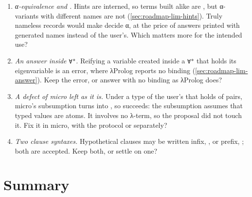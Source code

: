 \begin{enumerate}
    is loaded? The proposal does not measure what that would cost.
  \item \emph{α-equivalence and .} Hints are interned, so terms built alike are
    , but α-variants with different names are not (\cref{sec:roadmap-lim-hints}). Truly
    nameless records would make  decide α, at the price of answers printed with generated
    names instead of the user's. Which matters more for the intended use?
  \item \emph{An answer inside \texttt{∀°}.} Reifying a variable created inside a \texttt{∀°} that holds its
    eigenvariable is an error, where λProlog reports no binding (\cref{sec:roadmap-lim-answer}). Keep the
    error, or answer with no binding as λProlog does?
  \item \emph{A defect of micro left as it is.} Under a type of the user's that holds of pairs, micro's
    subsumption turns  into , so
     succeeds: the subsumption assumes that typed values
    are atoms. It involves no λ-term, so the proposal did not touch it. Fix it in micro, with the protocol
    or separately?
  \item \emph{Two clause syntaxes.} Hypothetical clauses may be written infix, , or prefix,
    ; both are accepted. Keep both, or settle on one?
\end{enumerate}

\section{Summary}\label{sec:roadmap-summary}

